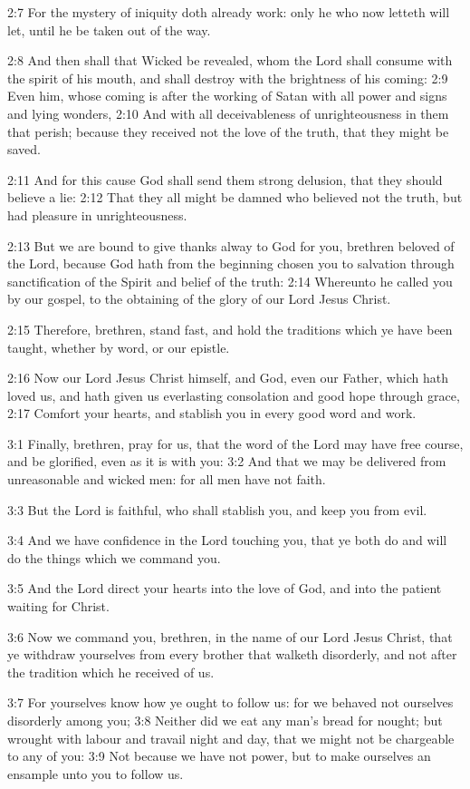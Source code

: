 2:7 For the mystery of iniquity doth already work: only he who now letteth will let, until he be taken out of the way.

2:8 And then shall that Wicked be revealed, whom the Lord shall consume with the spirit of his mouth, and shall destroy with the brightness of his coming: 2:9 Even him, whose coming is after the working of Satan with all power and signs and lying wonders, 2:10 And with all deceivableness of unrighteousness in them that perish; because they received not the love of the truth, that they might be saved.

2:11 And for this cause God shall send them strong delusion, that they should believe a lie: 2:12 That they all might be damned who believed not the truth, but had pleasure in unrighteousness.

2:13 But we are bound to give thanks alway to God for you, brethren beloved of the Lord, because God hath from the beginning chosen you to salvation through sanctification of the Spirit and belief of the truth: 2:14 Whereunto he called you by our gospel, to the obtaining of the glory of our Lord Jesus Christ.

2:15 Therefore, brethren, stand fast, and hold the traditions which ye have been taught, whether by word, or our epistle.

2:16 Now our Lord Jesus Christ himself, and God, even our Father, which hath loved us, and hath given us everlasting consolation and good hope through grace, 2:17 Comfort your hearts, and stablish you in every good word and work.

3:1 Finally, brethren, pray for us, that the word of the Lord may have free course, and be glorified, even as it is with you: 3:2 And that we may be delivered from unreasonable and wicked men: for all men have not faith.

3:3 But the Lord is faithful, who shall stablish you, and keep you from evil.

3:4 And we have confidence in the Lord touching you, that ye both do and will do the things which we command you.

3:5 And the Lord direct your hearts into the love of God, and into the patient waiting for Christ.

3:6 Now we command you, brethren, in the name of our Lord Jesus Christ, that ye withdraw yourselves from every brother that walketh disorderly, and not after the tradition which he received of us.

3:7 For yourselves know how ye ought to follow us: for we behaved not ourselves disorderly among you; 3:8 Neither did we eat any man's bread for nought; but wrought with labour and travail night and day, that we might not be chargeable to any of you: 3:9 Not because we have not power, but to make ourselves an ensample unto you to follow us.

